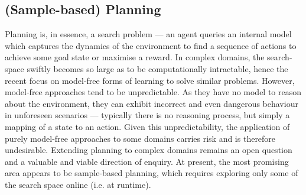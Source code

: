 \subsection{(Sample-based) Planning}
 Planning is, in essence, a search problem --- an agent queries an internal model which captures the dynamics of the environment to find a sequence of actions to achieve some goal state or maximise a reward. In complex domains, the search-space swiftly becomes so large as to be computationally intractable, hence the recent focus on model-free forms of learning to solve similar problems. However, model-free approaches tend to be unpredictable. As they have no model to reason about the environment, they can exhibit incorrect and even dangerous behaviour in unforeseen scenarios --- typically there is no reasoning process, but simply a mapping of a state to an action. Given this unpredictability, the application of purely model-free approaches to some domains carries risk and is therefore undesirable. Extending planning to complex domains remains an open question and a valuable and viable direction of enquiry. At present, the most promising area appears to be sample-based planning, which requires exploring only some of the search space online (i.e. at runtime).  

